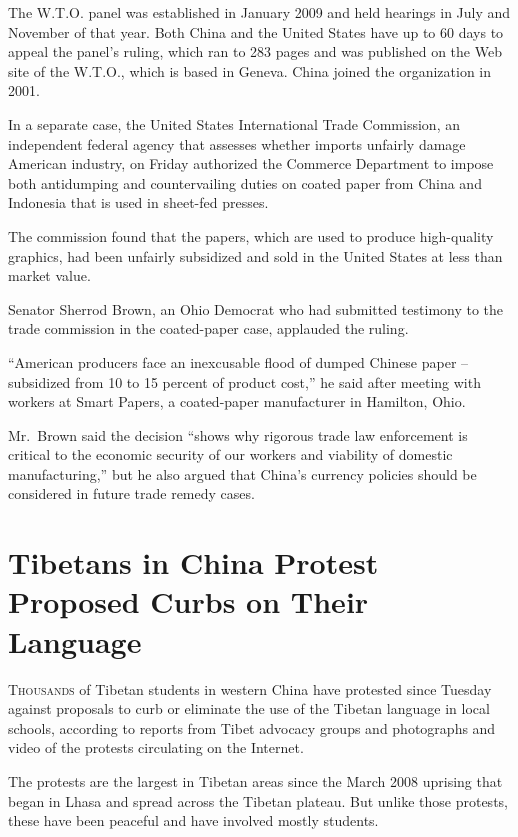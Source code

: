 ﻿\documentclass[12pt]{article}
\begin{document}
The W.T.O. panel was established in January 2009 and held hearings in July and November of that
year. Both China and the United States have up to 60 days to appeal the panel's ruling, which ran to
283 pages and was published on the Web site of the W.T.O., which is based in Geneva. China joined
the organization in 2001.

In a separate case, the United States International Trade Commission, an independent federal agency
that assesses whether imports unfairly damage American industry, on Friday authorized the Commerce
Department to impose both antidumping and countervailing duties on coated paper from China and
Indonesia that is used in sheet-fed presses.

The commission found that the papers, which are used to produce high-quality graphics, had been
unfairly subsidized and sold in the United States at less than market value.

Senator Sherrod Brown, an Ohio Democrat who had submitted testimony to the trade commission in the
coated-paper case, applauded the ruling.

``American producers face an inexcusable flood of dumped Chinese paper -- subsidized from 10 to 15
percent of product cost,'' he said after meeting with workers at Smart Papers, a coated-paper
manufacturer in Hamilton, Ohio.

Mr.~Brown said the decision ``shows why rigorous trade law enforcement is critical to the economic
security of our workers and viability of domestic manufacturing,'' but he also argued that China's
currency policies should be considered in future trade remedy cases.

\section{Tibetans in China Protest Proposed Curbs on Their Language}

\lettrine{T}{housands} of Tibetan students in western China have protested
since Tuesday against proposals to curb or eliminate the use of the Tibetan language in local
schools, according to reports from Tibet advocacy groups and photographs and video of the protests
circulating on the Internet.

The protests are the largest in Tibetan areas since the March 2008 uprising that began in Lhasa and
spread across the Tibetan plateau. But unlike those protests, these have been peaceful and have
involved mostly students.
\end{document}
